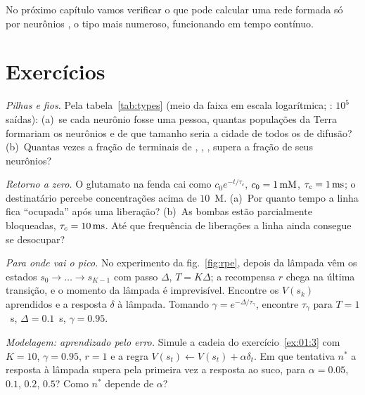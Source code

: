 No próximo capítulo vamos verificar o que pode calcular uma rede formada só por neurônios , o tipo mais numeroso, funcionando em tempo contínuo.

\section{Exercícios}

\begin{exercise}[\lvlA]
\label{ex:01:1}
\emph{Pilhas e fios.} Pela tabela~\ref{tab:types} (meio da faixa em escala logarítmica; : $10^5$ saídas): (a)~se cada neurônio fosse uma pessoa, quantas populações da Terra formariam os neurônios  e de que tamanho seria a cidade de todos os de difusão? (b)~Quantas vezes a fração de terminais de , , ,  supera a fração de seus neurônios?
\end{exercise}

\begin{exercise}[\lvlA]
\label{ex:01:2}
\emph{Retorno a zero.} O glutamato na fenda cai como $c_0e^{-t/\tau_c}$, $c_0=1\,\text{mM}$, $\tau_c=1\,\text{ms}$; o destinatário percebe concentrações acima de $10$~\textmu M. (a)~Por quanto tempo a linha fica ``ocupada'' após uma liberação? (b)~As bombas estão parcialmente bloqueadas, $\tau_c=10\,\text{ms}$. Até que frequência de liberações a linha ainda consegue se desocupar?
\end{exercise}

\begin{exercise}[\lvlB]
\label{ex:01:3}
\emph{Para onde vai o pico.} No experimento da fig.~\ref{fig:rpe}, depois da lâmpada vêm os estados $s_0\to\dots\to s_{K-1}$ com passo $\Delta$, $T=K\Delta$; a recompensa $r$ chega na última transição, e o momento da lâmpada é imprevisível. Encontre os $V(s_k)$ aprendidos e a resposta $\delta$ à lâmpada. Tomando $\gamma=e^{-\Delta/\tau_\gamma}$, encontre $\tau_\gamma$ para $T=1$~s, $\Delta=0.1$~s, $\gamma=0.95$.
\end{exercise}

\begin{exercise}[\lvlB]
\label{ex:01:4}
\emph{Modelagem: aprendizado pelo erro.} Simule a cadeia do exercício~\ref{ex:01:3} com $K=10$, $\gamma=0.95$, $r=1$ e a regra $V(s_t)\leftarrow V(s_t)+\alpha\delta_t$. Em que tentativa $n^*$ a resposta à lâmpada supera pela primeira vez a resposta ao suco, para $\alpha=0.05$, $0.1$, $0.2$, $0.5$? Como $n^*$ depende de $\alpha$?
\end{exercise}

